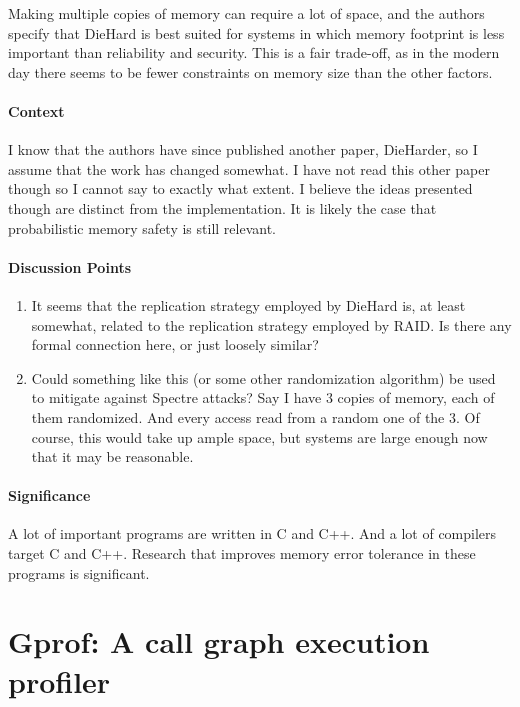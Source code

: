 Making multiple copies of memory can require a lot of space, and the authors
specify that DieHard is best suited for systems in which memory footprint is
less important than reliability and security. This is a fair trade-off, as in
the modern day there seems to be fewer constraints on memory size than the other
factors.

\paragraph{\textbf{Context}}
I know that the authors have since published another paper, DieHarder, so I
assume that the work has changed somewhat. I have not read this other paper
though so I cannot say to exactly what extent. I believe the ideas presented
though are distinct from the implementation. It is likely the case that
probabilistic memory safety is still relevant.

\paragraph{\textbf{Discussion Points}}
\begin{enumerate}
    \item It seems that the replication strategy employed by DieHard is, at
    least somewhat, related to the replication strategy employed by RAID. Is
    there any formal connection here, or just loosely similar?
    \item Could something like this (or some other randomization algorithm) be
    used to mitigate against Spectre attacks? Say I have 3 copies of memory,
    each of them randomized. And every access read from a random one of the 3.
    Of course, this would take up ample space, but systems are large enough now
    that it may be reasonable.
\end{enumerate}

\paragraph{\textbf{Significance}}
A lot of important programs are written in C and C++. And a lot of compilers
target C and C++. Research that improves memory error tolerance in these
programs is significant.

\section {Gprof: A call graph execution profiler \cite{graham1982gprof}}

